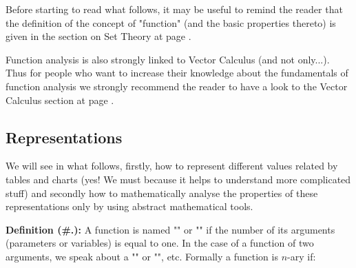 	\begin{tcolorbox}[title=Remark,arc=10pt,breakable,drop lifted shadow,
  skin=enhanced,
  skin first is subskin of={enhancedfirst}{arc=10pt,no shadow},
  skin middle is subskin of={enhancedmiddle}{arc=10pt,no shadow},
  skin last is subskin of={enhancedlast}{drop lifted shadow}]
Before starting to read what follows, it may be useful to remind the reader that the definition of the concept of "function" (and the basic properties thereto) is given in the section on Set Theory at page \pageref{functions and applications}.
	\end{tcolorbox}	

	Function analysis is also strongly linked to Vector Calculus (and not only...). Thus for people who want to increase their knowledge about the fundamentals of function analysis we strongly recommend the reader to have a look to the Vector Calculus section at page \pageref{vector calculus}.

\pagebreak
\subsection{Representations}

	We will see in what follows, firstly, how to represent different values related by tables and charts (yes! We must because it helps to understand more complicated stuff) and secondly how to mathematically analyse the properties of these representations only by using abstract mathematical tools.

	\textbf{Definition (\#\thesection.\mydef):} A function is named "" or  "" if the number of its arguments (parameters or variables) is equal to one. In the case of a function of two arguments, we speak about a "" or "", etc. Formally a function is $n$-ary if:
	

